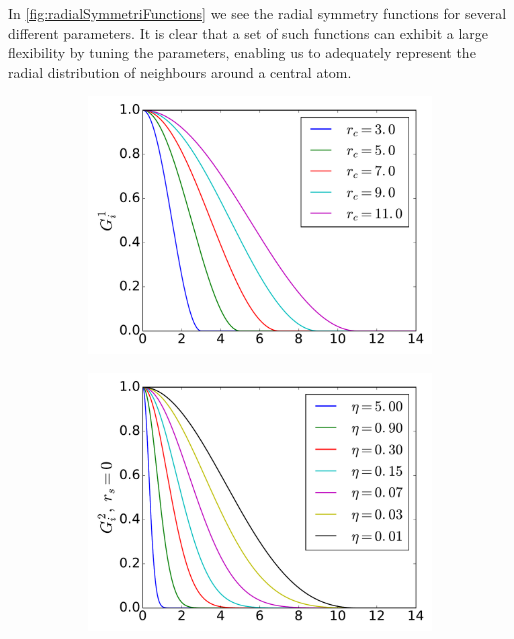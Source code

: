 \documentclass[twoside,english]{uiofysmaster}
\begin{document}
In \autoref{fig:radialSymmetriFunctions} we see the radial symmetry functions for several
different parameters. It is clear that a set of such functions can exhibit a large flexibility by tuning the parameters,
enabling us to adequately represent the radial distribution of neighbours around a central atom. 
\begin{figure}
  \begin{subfigure}{0.5\linewidth}
    \centering
    \includegraphics[width=\linewidth]{Figures/Theory/G1.pdf} 
    \label{fig:radialSymmetriFunctions:a} 
  \end{subfigure}%
  \begin{subfigure}{0.5\linewidth}
    \centering
    \includegraphics[width=\linewidth]{Figures/Theory/G2_1.pdf} 

\end{subfigure}
\end{figure}
\end{document}
